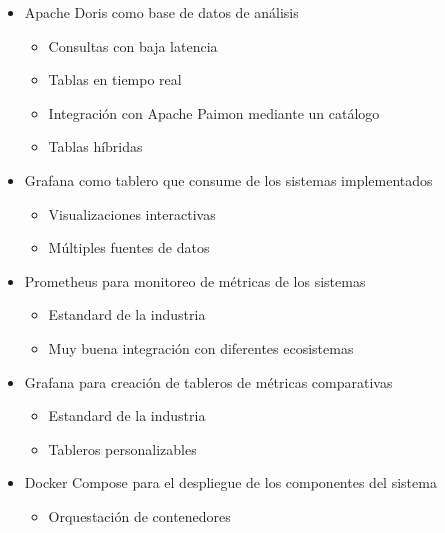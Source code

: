 \begin{itemize}
\begin{itemize}
       \end{itemize}
    \item Apache Doris como base de datos de análisis
       \begin{itemize}
           \item Consultas con baja latencia
           \item Tablas en tiempo real
           \item Integración con Apache Paimon mediante un catálogo
           \item Tablas híbridas
       \end{itemize}
    \newpage
    \item Grafana como tablero que consume de los sistemas implementados
       \begin{itemize}
           \item Visualizaciones interactivas
           \item Múltiples fuentes de datos
       \end{itemize}
    \item Prometheus para monitoreo de métricas de los sistemas
       \begin{itemize}
           \item Estandard de la industria
           \item Muy buena integración con diferentes ecosistemas
       \end{itemize}
    \item Grafana para creación de tableros de métricas comparativas
       \begin{itemize}
            \item Estandard de la industria
            \item Tableros personalizables
       \end{itemize}
    \item Docker Compose para el despliegue de los componentes del sistema
       \begin{itemize}
           \item Orquestación de contenedores
       \end{itemize}
   \end{itemize}
\newpage